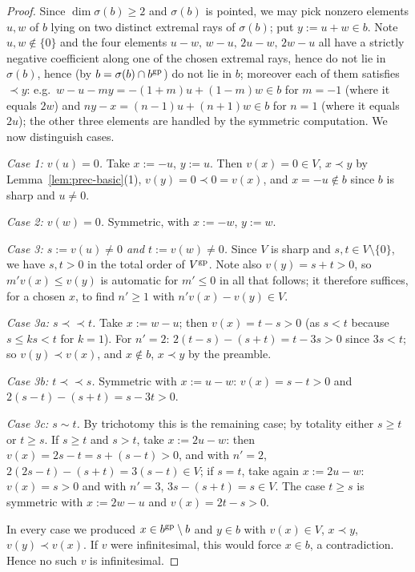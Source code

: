 \documentclass[11pt]{amsart}
\theoremstyle{plain}
\theoremstyle{remark}
\theoremstyle{definition}
\numberwithin{equation}{section}
\begin{document}
\begin{proof}
Since $\dim\sigma(b)\ge2$ and $\sigma(b)$ is pointed, we may pick nonzero
elements $u,w$ of $b$ lying on two distinct extremal rays of $\sigma(b)$;
put $y:=u+w\in b$.  Note $u,w\notin\{0\}$ and the four elements
$u-w,\,w-u,\,2u-w,\,2w-u$ all have a strictly negative coefficient along
one of the chosen extremal rays, hence do not lie in $\sigma(b)$, hence
(by $b=\sigma(b)\cap b^{\rm gp}$) do not lie in $b$; moreover each of them
satisfies $\prec y$: e.g.\ $w-u-my=-(1+m)u+(1-m)w\in b$ for $m=-1$
(where it equals $2w$) and $ny-x=(n-1)u+(n+1)w\in b$ for $n=1$ (where it
equals $2u$); the other three elements are handled by the symmetric
computation.  We now distinguish cases.

\emph{Case 1: $v(u)=0$.}  Take $x:=-u$, $y:=u$.  Then
$v(x)=0\in V$, $x\prec y$ by Lemma~\ref{lem:prec-basic}(1),
$v(y)=0\prec 0=v(x)$, and $x=-u\notin b$ since $b$ is sharp and $u\ne0$.

\emph{Case 2: $v(w)=0$.}  Symmetric, with $x:=-w$, $y:=w$.

\emph{Case 3: $s:=v(u)\ne0$ and $t:=v(w)\ne0$.}  Since $V$ is sharp and
$s,t\in V\setminus\{0\}$, we have $s,t>0$ in the total order of
$V^{\rm gp}$.  Note also $v(y)=s+t>0$, so $m'v(x)\le v(y)$ is automatic
for $m'\le0$ in all that follows; it therefore suffices, for a chosen
$x$, to find $n'\ge1$ with $n'v(x)-v(y)\in V$.

\emph{Case 3a: $s\prec\prec t$.}  Take $x:=w-u$; then
$v(x)=t-s>0$ (as $s<t$ because $s\le ks<t$ for $k=1$).  For $n'=2$:
$2(t-s)-(s+t)=t-3s>0$ since $3s<t$; so $v(y)\prec v(x)$, and
$x\notin b$, $x\prec y$ by the preamble.

\emph{Case 3b: $t\prec\prec s$.}  Symmetric with $x:=u-w$:
$v(x)=s-t>0$ and $2(s-t)-(s+t)=s-3t>0$.

\emph{Case 3c: $s\sim t$.}  By trichotomy this is the remaining case; by
totality either $s\ge t$ or $t\ge s$.  If $s\ge t$ and $s>t$, take
$x:=2u-w$: then $v(x)=2s-t=s+(s-t)>0$, and with $n'=2$,
$2(2s-t)-(s+t)=3(s-t)\in V$; if $s=t$, take again $x:=2u-w$:
$v(x)=s>0$ and with $n'=3$, $3s-(s+t)=s\in V$.  The case $t\ge s$ is
symmetric with $x:=2w-u$ and $v(x)=2t-s>0$.

In every case we produced $x\in b^{\rm gp}\setminus b$ and $y\in b$ with
$v(x)\in V$, $x\prec y$, $v(y)\prec v(x)$.  If $v$ were infinitesimal,
this would force $x\in b$, a contradiction.  Hence no such $v$ is
infinitesimal.
\end{proof}
\end{document}
